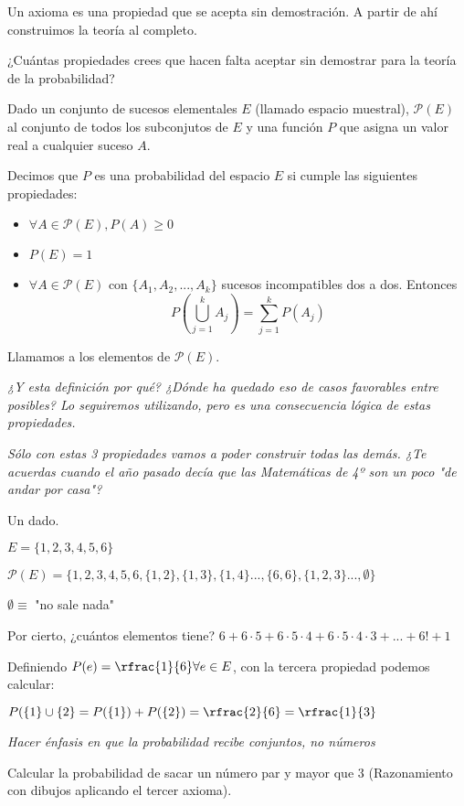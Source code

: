 Un axioma es una propiedad que se acepta sin demostración. A partir de ahí construimos la teoría al completo.

{¿Cuántas propiedades crees que hacen falta aceptar sin demostrar para la teoría de la probabilidad?}


\begin{defn}
Dado un conjunto de sucesos elementales $E$ (llamado espacio muestral), $\mathcal{P}(E)$ al conjunto de todos los subconjutos de $E$ y una función $P$ que asigna un valor real a cualquier suceso $A$.

Decimos que $P$ es una probabilidad del espacio $E$ si cumple las siguientes propiedades:

\begin{itemize}
	\item $\forall A\in \mathcal{P}(E), P(A)\geq 0$
	\item $P(E) = 1$
	\item $\forall A\in \mathcal{P}(E)$ con $\{A_1,A_2,..., A_k\}$ sucesos incompatibles dos a dos. Entonces \[ P\left(\bigcup_{j=1}^k A_j\right) = \sum_{j=1}^k P(A_j) \]
\end{itemize}

\obs Llamamos  a los elementos de $\mathcal{P}(E)$.

\end{defn}

\textit{¿Y esta definición por qué? ¿Dónde ha quedado eso de casos favorables entre posibles? Lo seguiremos utilizando, pero es una consecuencia lógica de estas propiedades.}

\textit{Sólo con estas 3 propiedades vamos a poder construir todas las demás. ¿Te acuerdas cuando el año pasado decía que las Matem\'aticas de 4º son un poco "de andar por casa"?}

\begin{example} Un dado. 

$E = \{1,2,3,4,5,6\}$

$\mathcal{P}(E) = \{1,2,3,4,5,6,\{1,2\},\{1,3\},\{1,4\} ... , \{6,6\},\{1,2,3\} ..., \emptyset \}$

$\emptyset \equiv$ "no sale nada"

Por cierto, ¿cuántos elementos tiene? $6+6·5+6·5·4+6·5·4·3+... + 6!+1$

Definiendo $P(e) = \rfrac{1}{6} \forall e\in E$, con la tercera propiedad podemos calcular:

$P(\{1\} \cup \{2\} = P(\{1\}) + P(\{2\}) = \rfrac{2}{6} = \rfrac{1}{3}$

\textit{Hacer énfasis en que la probabilidad recibe conjuntos, no números}

Calcular la probabilidad de sacar un número par y mayor que $3$ (Razonamiento con dibujos aplicando el tercer axioma).

\end{example}

